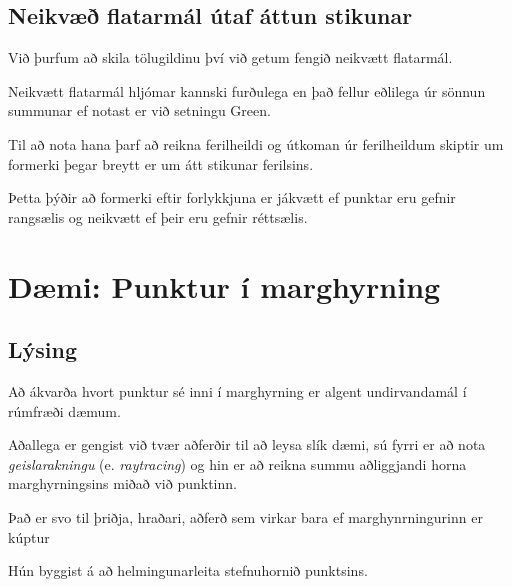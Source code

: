 \subsection{Neikvæð flatarmál útaf áttun stikunar}
{
    {
        \item<1-> Við þurfum að skila tölugildinu því við getum fengið neikvætt flatarmál.
        \item<2-> Neikvætt flatarmál hljómar kannski furðulega en það fellur eðlilega úr sönnun summunar
                    ef notast er við setningu Green.
        \item<3-> Til að nota hana þarf að reikna ferilheildi og útkoman úr ferilheildum skiptir
                    um formerki þegar breytt er um átt stikunar ferilsins.
        \item<4-> Þetta þýðir að formerki  eftir forlykkjuna er jákvætt ef punktar  
                    eru gefnir rangsælis og neikvætt ef þeir eru gefnir réttsælis.
    }
}

\section{Dæmi: Punktur í marghyrning}
\subsection{Lýsing}
{
    {
        \item<1-> Að ákvarða hvort punktur sé inni í marghyrning er algent undirvandamál í rúmfræði dæmum.
        \item<2-> Aðallega er gengist við tvær aðferðir til að leysa slík dæmi, sú fyrri er að nota \emph{geislarakningu}
                    (e. \emph{raytracing}) og hin er að reikna summu aðliggjandi horna marghyrningsins miðað við punktinn.
        \item<3-> Það er svo til þriðja, hraðari, aðferð sem virkar bara ef marghynrningurinn er kúptur
        \item<4-> Hún byggist á að helmingunarleita stefnuhornið punktsins.
    }
}

